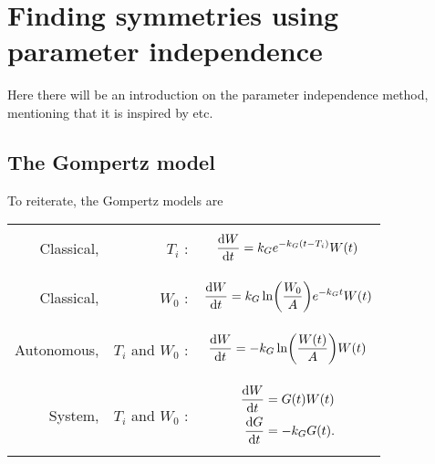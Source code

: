 \chapter{Finding symmetries using parameter independence} \label{ch:param-ind}

Here there will be an introduction on the parameter independence method, mentioning that it is inspired by \cite{ovsiannikov1982group} etc.

\section{The Gompertz model}
To reiterate, the Gompertz models are\par\noindent
\begin{tabularx}{\linewidth}{rrM}
  Classical, & \(T_i\) :&
  \begin{minipage}{\linewidth}
    \begin{equation}
      \diff{W}{t} = k_G e^{-k_G (t - T_i)} W(t) \label{eq:gompertz-classical-ti^param}
    \end{equation}
  \end{minipage}\tabularnewline
  Classical, & \(W_0\) :&
  \begin{minipage}{\linewidth}
    \begin{equation}
      \diff{W}{t} = k_G \ln(\frac{W_0}{A})e^{-k_G t} W(t) \label{eq:gompertz-classical-w0^param}
    \end{equation}
  \end{minipage}\tabularnewline
  Autonomous, & \(T_i\) and \(W_0\) :&
  \begin{minipage}{\linewidth}
    \begin{equation}
      \diff{W}{t} = -k_G \ln(\frac{W(t)}{A}) W(t) \label{eq:gompertz-autonomous^param}
    \end{equation}
  \end{minipage}\tabularnewline
  System, & \(T_i\) and \(W_0\) :&
  \begin{minipage}{\linewidth}%
    {\begin{subequations}\label{eq:gompertz-system^param}
      \begin{align}
        \diff{W}{t} &= G(t) W(t) \label{eq:gompertz-system-a^param}\\
        \diff{G}{t} &= -k_G G(t). \label{eq:gompertz-system-b^param}
      \end{align}
    \end{subequations}}%
  \end{minipage}
\end{tabularx}


